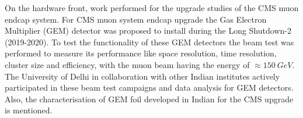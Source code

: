 On the hardware front, work performed for the upgrade studies of the CMS muon endcap system. For CMS muon system endcap upgrade the Gas Electron Multiplier (GEM) detector was proposed to install during the Long Shutdown-2 (2019-2020). To test the functionality of these GEM detectors the beam test was performed to measure its performance like space resolution, time resolution, cluster size and efficiency, with the muon beam having the energy of $\approx 150~GeV$. The University of Delhi in collaboration with other Indian institutes actively participated in these beam test campaigns and data analysis for GEM detectors. Also, the characterisation of GEM foil developed in Indian for the CMS upgrade is mentioned.
